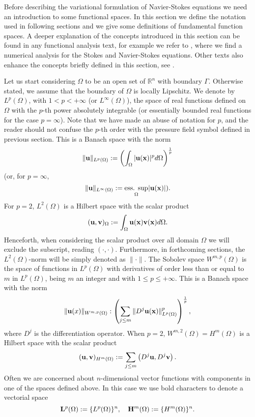 Before describing the variational formulation of Navier-Stokes equations we need an introduction to some functional spaces. In this section we define the notation used in following sections and we give some definitions of fundamental function spaces. A deeper explanation of the concepts introduced in this section can be found in any functional analysis text, for example we refer to \cite{temam_navier-stokes_2001}, where we find a numerical analysis for the Stokes and Navier-Stokes equations. Other texts also enhance the concepts briefly defined in this section, see \cite{brenner_mathematical_2007}.

Let us start considering $\Omega$ to be an open set of $\mathbb{R}^n$ with boundary $\Gamma$. Otherwise stated, we assume that the boundary of $\Omega$ is locally Lipschitz. We denote by $L^p(\Omega)$, with $1<p<+\infty$ (or $L^\infty(\Omega)$), the space of real functions defined on $\Omega$ with the $p$-th power absolutely integrable (or essentially bounded real functions for the case $p=\infty$). Note that we have made an abuse of notation for $ p $, and the reader should not confuse the $ p $-th order with the pressure field symbol defined in previous section. This is a Banach space with the norm 
$$\|{\bf u}\|_{L^p(\Omega)}:=\left(\int_\Omega|{\bf u}({\bf x})|^pd\Omega\right)^{\frac{1}{p}}$$
(or, for $p=\infty$,
$$\|{\bf u}\|_{L^\infty(\Omega)}:=\underset{\Omega}{\mbox{ess. sup}}|{\bf u}({\bf x})|).$$
For $p=2$, $L^2(\Omega)$ is a Hilbert space with the scalar product
$$({\bf u},{\bf v})_\Omega:=\int_\Omega{\bf u}({\bf x}){\bf v}({\bf x})d\Omega.$$
Henceforth, when considering the scalar product over all domain $\Omega$ we will exclude the subscript, reading $(\cdot,\cdot)$. Furthermore, in forthcoming sections, the $L^2(\Omega)$-norm will be simply denoted as $\|\cdot\|$.
The Sobolev space  $W^{m,p}(\Omega)$ is the space of functions in $L^p(\Omega)$ with derivatives of order less than or equal to $m$ in $L^p(\Omega)$, being $m$ an integer and with $1\leq p\leq+\infty$. This is a Banach space with the norm
$$\|{\bf u}(x)\|_{W^{m,p}(\Omega)}:\left(\sum_{j\leq m}\|D^j{\bf u}({\bf x})\|^p_{L^p(\Omega)}\right)^{\frac{1}{p}},$$
where $D^j$ is the differentiation operator. When $p=2$, $W^{m,2}(\Omega)=H^m(\Omega)$ is a Hilbert space with the scalar product
$$({\bf u},{\bf v})_{H^m(\Omega)}:=\sum_{j\leq m}\left(D^j{\bf u},D^j{\bf v}\right).$$
Often we are concerned about $n$-dimensional vector functions with components in one of the spaces defined above. In this case we use bold characters to denote a vectorial space
$${\bf L}^p(\Omega):=\{L^p(\Omega)\}^n,\quad{\bf H}^m(\Omega):=\{H^m(\Omega)\}^n.$$

